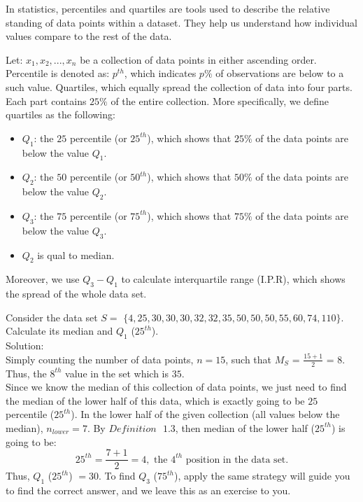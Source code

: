 \noindent
In statistics, percentiles and quartiles are tools used to describe the relative standing of data points within a dataset. They help us understand how individual values compare to the rest of the data.

\begin{definition}
Let: $x_1, x_2, ..., x_n$ be a collection of data points in either ascending order. Percentile is denoted as: $p^{th}$, which indicates $p \%$ of observations are below to a such value. Quartiles, which equally spread the collection of data into four parts. Each part contains $25\%$ of the entire collection. More specifically, we define quartiles as the following:
\begin{itemize}
 \item $Q_1$: the $25$ percentile (or $25^{th}$), which shows that $25\%$ of the data points are below the value $Q_1$.
 \item $Q_2$: the $50$ percentile (or $50^{th}$), which shows that $50\%$ of the data points are below the value $Q_2$.
 \item $Q_3$: the $75$ percentile (or $75^{th}$), which shows that $75\%$ of the data points are below the value $Q_3$.
 \item $Q_2$ is qual to median.
\end{itemize}
Moreover, we use $Q_3 - Q_1$ to calculate interquartile range (I.P.R), which shows the spread of the whole data set.
\end{definition}
 
 \begin{example}
Consider the data set $S = $ $\{4, 25, 30, 30, 30, 32, 32, 35, 50, 50, 50, 55, 60, 74, 110\}$. Calculate its median and $Q_1$ ($25^{th}$).\\
Solution:\\
Simply counting the number of data points, $n = 15$, such that $M_{S}$ = $\frac{15 + 1}{2}$ = $8$. Thus, the $8^{th}$ value in the set which is $35$.\\
Since we know the median of this collection of data points, we just need to find the median of the lower half of this data, which is exactly going to be $25$ percentile ($25^{th}$). In the lower half of the given collection (all values below the median), $n_{lower} = 7$. By $Definition \text{ } 1.3$, then median of the lower half ($25^{th}$) is going to be: \[ 25^{th} = \frac{7+1}{2} = 4, \text{ the $4^{th}$ position in the data set}.\] Thus, $Q_1$ ($25^{th}$) $= 30$. To find $Q_3$ ($75^{th}$), apply the same strategy will guide you to find the correct answer, and we leave this as an exercise to you.
\end{example}

